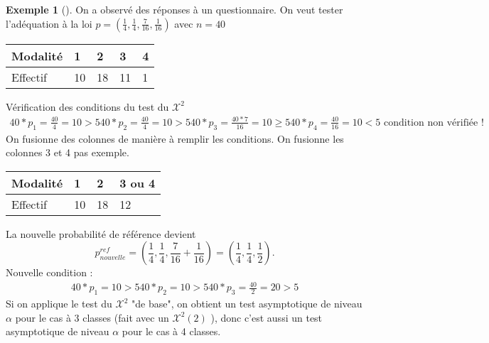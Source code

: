 \documentclass{article}
\theoremstyle{plain}%
\theoremstyle{definition}
\newtheorem{exmp}{Exemple}[section]
\theoremstyle{remark}
\begin{document}
\begin{exmp}[]
    On a observé des réponses à un questionnaire. On veut tester l'adéquation à la loi $ p=(\frac{1}{4}, \frac{1}{4}, \frac{7}{16}, \frac{1}{16}) $ avec $ n=40 $

    \begin{table}[!h]
        \centering
        \begin{tabular}{|l|l|l|l|l|}
        \hline
            Modalité & 1 & 2 & 3 & 4 \\ \hline
            Effectif & 10 & 18 & 11 & 1 \\ \hline
        \end{tabular}
    \end{table}

    Vérification des conditions du test du $ \mathcal{X}^2 $ 
    \begin{align*}
        40*p_1 = \frac{40}{4} = 10 > 5
        40*p_2 = \frac{40}{4} = 10 > 5
        40*p_3 = \frac{40*7}{16} = 10 \geq  5
        40*p_4 = \frac{40}{16} = 10 < 5 \text{ condition non vérifiée !}
    \end{align*}
    On fusionne des colonnes de manière à remplir les conditions. On fusionne les colonnes 3 et 4 pas exemple.

    \begin{table}[!ht]
        \centering
        \begin{tabular}{|l|l|l|l|}
        \hline
            Modalité & 1 & 2 & 3 ou 4 \\ \hline
            Effectif & 10 & 18 & 12 \\ \hline
        \end{tabular}
    \end{table}

    La nouvelle probabilité de référence devient 
    \[
        p^{ref}_{nouvelle} = ( \frac{1}{4}, \frac{1}{4}, \frac{7}{16} + \frac{1}{16}) = (\frac{1}{4}, \frac{1}{4}, \frac{1}{2})
    .\]
    Nouvelle condition : 
    \begin{align*}
        40 * p_1 = 10 > 5
        40 * p_2 = 10 > 5
        40 * p_3 = \frac{40}{2} = 20 > 5
    \end{align*}
    Si on applique le test du $ \mathcal{X}^2 $ "de base", on obtient un test asymptotique de niveau $ \alpha $ pour le cas à 3 classes (fait avec un $ \mathcal{X}^2(2) $ ), donc c'est aussi un test asymptotique de niveau $ \alpha  $ pour le cas à 4 classes.
    

\end{exmp}
\end{document}
